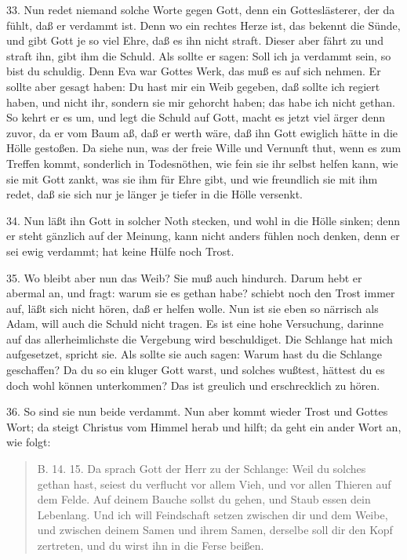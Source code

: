 33. Nun redet niemand solche Worte gegen Gott, denn ein Gotteslästerer, der da fühlt, daß er verdammt ist. Denn wo ein rechtes Herze ist, das bekennt die Sünde, und gibt Gott je so viel Ehre, daß es ihn nicht straft. Dieser aber fährt zu und straft ihn, gibt ihm die Schuld. Als sollte er sagen: Soll ich ja verdammt sein, so bist du schuldig. Denn Eva war Gottes Werk, das muß es auf sich nehmen. Er sollte aber gesagt haben: Du hast mir ein Weib gegeben, daß sollte ich regiert haben, und nicht ihr, sondern sie mir gehorcht haben; das habe ich nicht gethan. So kehrt er es um, und legt die Schuld auf Gott, macht es jetzt viel ärger denn zuvor, da er vom Baum aß, daß er werth wäre, daß ihn Gott ewiglich hätte in die Hölle gestoßen. Da siehe nun, was der freie Wille und Vernunft thut, wenn es zum Treffen kommt, sonderlich in Todesnöthen, wie fein sie ihr selbst helfen kann, wie sie mit Gott zankt, was sie ihm für Ehre gibt, und wie freundlich sie mit ihm redet, daß sie sich nur je länger je tiefer in die Hölle versenkt.

34. Nun läßt ihn Gott in solcher Noth stecken, und wohl in die Hölle sinken; denn er steht gänzlich auf der Meinung, kann nicht anders fühlen noch denken, denn er sei ewig verdammt; hat keine Hülfe noch Trost.

35. Wo bleibt aber nun das Weib? Sie muß auch hindurch. Darum hebt er abermal an, und fragt: warum sie es gethan habe? schiebt noch den Trost immer auf, läßt sich nicht hören, daß er helfen wolle. Nun ist sie eben so närrisch als Adam, will auch die Schuld nicht tragen. Es ist eine hohe Versuchung, darinne auf das allerheimlichste die Vergebung wird beschuldiget. Die Schlange hat mich aufgesetzet, spricht sie. Als sollte sie auch sagen: Warum hast du die Schlange geschaffen? Da du so ein kluger Gott warst, und solches wußtest, hättest du es doch wohl können unterkommen? Das ist greulich und erschrecklich zu hören.

36. So sind sie nun beide verdammt. Nun aber kommt wieder Trost und Gottes Wort; da steigt Christus vom Himmel herab und hilft; da geht ein ander Wort an, wie folgt:

\begin{quote}
B. 14. 15. Da sprach Gott der Herr zu der Schlange: Weil du solches gethan hast, seiest du verflucht vor allem Vieh, und vor allen Thieren auf dem Felde. Auf deinem Bauche sollst du gehen, und Staub essen dein Lebenlang. Und ich will Feindschaft setzen zwischen dir und dem Weibe, und zwischen deinem Samen und ihrem Samen, derselbe soll dir den Kopf zertreten, und du wirst ihn in die Ferse beißen.
\end{quote}

